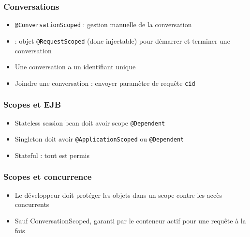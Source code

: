 \documentclass[english, french]{beamer}
\begin{document}
\begin{frame}
	\frametitle{Conversations}
	\begin{itemize}
		\item \texttt{@ConversationScoped} : gestion manuelle de la conversation
		\item {} : objet \texttt{@RequestScoped} (donc injectable) pour démarrer et terminer une conversation
		\item Une conversation a un identifiant unique
		\item Joindre une conversation : envoyer paramètre de requête \texttt{cid} %
	\end{itemize}
\end{frame}

\begin{frame}
	\frametitle{Scopes et EJB}
	\begin{itemize}
		\item Stateless session bean doit avoir scope \texttt{@Dependent}
		\item Singleton doit avoir \texttt{@ApplicationScoped} {\tiny ou \texttt{@Dependent}}
		\item Stateful : tout est permis
	\end{itemize}
\end{frame}

\begin{frame}
	\frametitle{Scopes et concurrence}
	\begin{itemize}
		\item Le développeur doit protéger les objets dans un scope contre les accès concurrents
		\item Sauf ConversationScoped, garanti par le conteneur actif pour une requête à la fois
	\end{itemize}
\end{frame}
\end{document}
